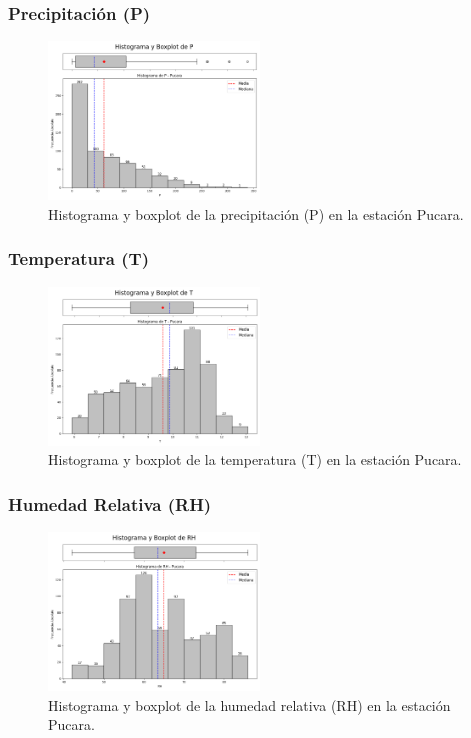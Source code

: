 \subsubsection*{Precipitación (P)}
\begin{figure}[H]
\centering
\includegraphics[width=0.5\textwidth]{resultados/por_estacion_meteorologica/Pucara/P_histograma.png}
\caption{Histograma y boxplot de la precipitación (P) en la estación Pucara.}
\label{fig:pucara_P}
\end{figure}

\subsubsection*{Temperatura (T)}
\begin{figure}[H]
\centering
\includegraphics[width=0.5\textwidth]{resultados/por_estacion_meteorologica/Pucara/T_histograma.png}
\caption{Histograma y boxplot de la temperatura (T) en la estación Pucara.}
\label{fig:pucara_T}
\end{figure}

\subsubsection*{Humedad Relativa (RH)}
\begin{figure}[H]
\centering
\includegraphics[width=0.5\textwidth]{resultados/por_estacion_meteorologica/Pucara/RH_histograma.png}
\caption{Histograma y boxplot de la humedad relativa (RH) en la estación Pucara.}
\label{fig:pucara_RH}
\end{figure}

